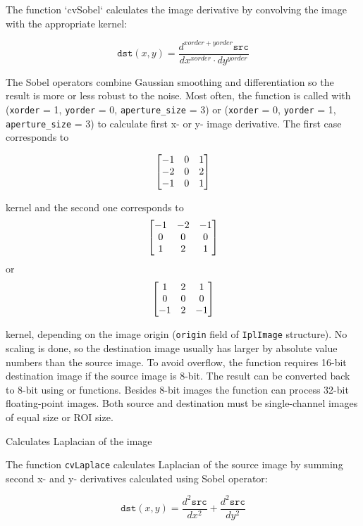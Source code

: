 The function `cvSobel` calculates the image derivative by convolving the image with the appropriate kernel:

\[
\texttt{dst}(x,y) = \frac{d^{xorder+yorder} \texttt{src}}{dx^{xorder} \cdot dy^{yorder}}
\]

The Sobel operators combine Gaussian smoothing and differentiation
so the result is more or less robust to the noise. Most often,
the function is called with (\texttt{xorder} = 1, \texttt{yorder} = 0,
\texttt{aperture\_size} = 3) or (\texttt{xorder} = 0, \texttt{yorder} = 1,
\texttt{aperture\_size} = 3) to calculate first x- or y- image
derivative. The first case corresponds to

\[ \begin{bmatrix} -1 & 0 & 1\\ -2 & 0 & 2\\ -1 & 0 & 1 \end{bmatrix}
\]

kernel and the second one corresponds to
\[ \begin{bmatrix} -1 & -2 & -1\\ 0 & 0 & 0\\ 1 & 2 & 1 \end{bmatrix}
\]
or
\[ \begin{bmatrix} 1 & 2 & 1\\ 0 & 0 & 0\\ -1 & 2 & -1 \end{bmatrix}
\]

kernel, depending on the image origin (\texttt{origin} field of
\texttt{IplImage} structure). No scaling is done, so the destination image
usually has larger by absolute value numbers than the source image. To
avoid overflow, the function requires 16-bit destination image if the
source image is 8-bit. The result can be converted back to 8-bit using
 or  functions. Besides 8-bit images
the function can process 32-bit floating-point images. Both source and
destination must be single-channel images of equal size or ROI size.

\label{Laplace}
\label{Laplace}
Calculates Laplacian of the image

\begin{description}
\end{description}

The function \texttt{cvLaplace} calculates Laplacian of the source image by summing second x- and y- derivatives calculated using Sobel operator:

\[
\texttt{dst}(x,y) = \frac{d^2 \texttt{src}}{dx^2} + \frac{d^2 \texttt{src}}{dy^2}
\]

